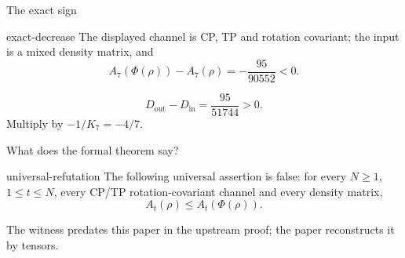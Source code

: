 \documentclass{beamer}
\begin{document}
\begin{frame}{The exact sign}
\begin{bookresult}{exact-decrease}
The displayed channel is CP, TP and rotation covariant; the input is a mixed density matrix, and
\[A_7(\Phi(\rho))-A_7(\rho)=-\frac{95}{90552}<0.\]
\end{bookresult}
\[D_{\mathrm{out}}-D_{\mathrm{in}}=\frac{95}{51744}>0.\]
Multiply by $-1/K_7=-4/7$.
\end{frame}
\begin{frame}{What does the formal theorem say?}
\begin{bookresult}{universal-refutation}
The following universal assertion is false: for every $N\geq1$, $1\leq t\leq N$, every CP/TP rotation-covariant channel and every density matrix,
\[A_t(\rho)\leq A_t(\Phi(\rho)).\]
\end{bookresult}
\small The witness predates this paper in the upstream proof; the paper reconstructs it by tensors.
\end{frame}
\end{document}
